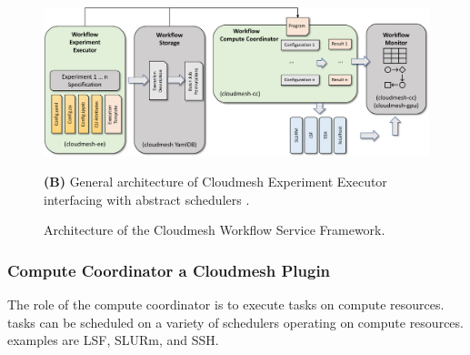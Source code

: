 \documentclass[utf8]{FrontiersinVancouver} %
\begin{document}
\begin{figure}[htb]
{    \centering\includegraphics[width=1.0\columnwidth]{images/cloudmesh-ee-new}
    
    
    {\bf (B)} General architecture of Cloudmesh Experiment Executor interfacing with abstract schedulers \citep{las-frontiers-edu}.
  }

  
  
    \caption{Architecture of the Cloudmesh Workflow Service Framework.}
    \label{fig:cc-2}

\end{figure}
 


\subsubsection{Compute Coordinator a Cloudmesh Plugin}

The role of the compute coordinator is to execute tasks on compute resources. tasks can be scheduled on a variety of schedulers operating on compute resources. examples are LSF, SLURm, and SSH.
\end{document}
